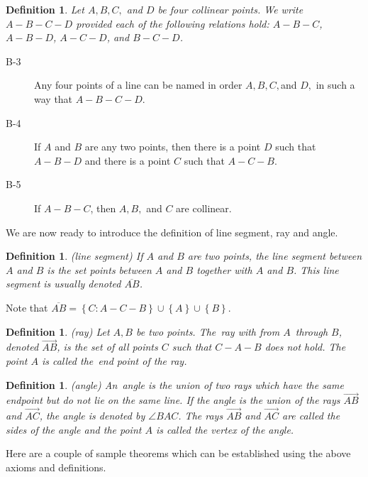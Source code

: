 \documentclass[12pt]{article}
\newtheorem{definition}[theorem]{Definition}
\begin{document}
\begin{definition}
Let $A,B,C,$ and $D$ be four collinear points. We write $A-B-C-D$ provided
each of the following relations hold: $A-B-C$, $A-B-D$, $A-C-D$, and $B-C-D$.
\end{definition}

\begin{description}
\item[B-3]  Any four points of a line can be named in order $A,B,C,$and $D,$
in such a way that $A-B-C-D$.

\item[B-4]  If $A$ and $B$ are any two points, then there is a point $D$
such that $A-B-D$ and there is a point $C$ such that $A-C-B$.

\item[B-5]  If $A-B-C$, then $A,B,$ and $C$ are collinear.
\end{description}

We are now ready to introduce the definition of line segment, ray and angle.

\begin{definition}
(line segment) If $A$ and $B$ are two points, the line segment between $A$
and $B$ is the set points between $A$ and $B$ together with $A$ and $B$.
This line segment is usually denoted $\overline{AB}$.
\end{definition}

Note that $\overline{AB}=\left\{ C:A-C-B\right\} \cup \left\{ A\right\} \cup
\left\{ B\right\} $.

\begin{definition}
(ray) Let $A,B$ be two points. The\emph{\ ray with from }$A$\emph{\ through }%
$B$, denoted $\overrightarrow{AB}$, is the set of all points $C$ such that $%
C-A-B$ does not hold. The point $A$ is called the\emph{\ end point} of the
ray.
\end{definition}

\begin{definition}
(angle) An\emph{\ angle} is the union of two rays which have the same
endpoint but do not lie on the same line. If the angle is the union of the
rays $\overrightarrow{AB}$ and $\overrightarrow{AC}$, the angle is denoted
by $\angle BAC$. The rays $\overrightarrow{AB}$ and $\overrightarrow{AC}$
are called the \emph{sides of the angle} and the point $A$ is called the 
\emph{vertex of the angle}.
\end{definition}

Here are a couple of sample theorems which can be established using the
above axioms and definitions.
\end{document}
